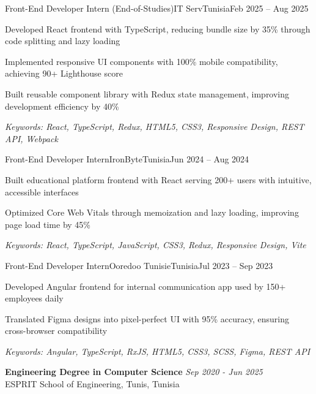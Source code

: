 \documentclass[11pt,a4paper]{article}
\begin{document}
\makecvheader
\makecontactinfo


\begin{internship}{Front-End Developer Intern (End-of-Studies)}{IT Serv}{Tunisia}{Feb 2025 -- Aug 2025}{}
  \item Developed React frontend with TypeScript, reducing bundle size by 35\% through code splitting and lazy loading
  \item Implemented responsive UI components with 100\% mobile compatibility, achieving 90+ Lighthouse score
  \item Built reusable component library with Redux state management, improving development efficiency by 40\%
  \item[] \textit{\footnotesize Keywords: React, TypeScript, Redux, HTML5, CSS3, Responsive Design, REST API, Webpack}
\end{internship}

\begin{internship}{Front-End Developer Intern}{IronByte}{Tunisia}{Jun 2024 -- Aug 2024}{}
  \item Built educational platform frontend with React serving 200+ users with intuitive, accessible interfaces
  \item Optimized Core Web Vitals through memoization and lazy loading, improving page load time by 45\%
  \item[] \textit{\footnotesize Keywords: React, TypeScript, JavaScript, CSS3, Redux, Responsive Design, Vite}
\end{internship}

\begin{internship}{Front-End Developer Intern}{Ooredoo Tunisie}{Tunisia}{Jul 2023 -- Sep 2023}{}
  \item Developed Angular frontend for internal communication app used by 150+ employees daily
  \item Translated Figma designs into pixel-perfect UI with 95\% accuracy, ensuring cross-browser compatibility
  \item[] \textit{\footnotesize Keywords: Angular, TypeScript, RxJS, HTML5, CSS3, SCSS, Figma, REST API}
\end{internship}

\textbf{Engineering Degree in Computer Science} \hfill \textit{Sep 2020 - Jun 2025}\\[-2pt]
ESPRIT School of Engineering, Tunis, Tunisia
\end{document}
